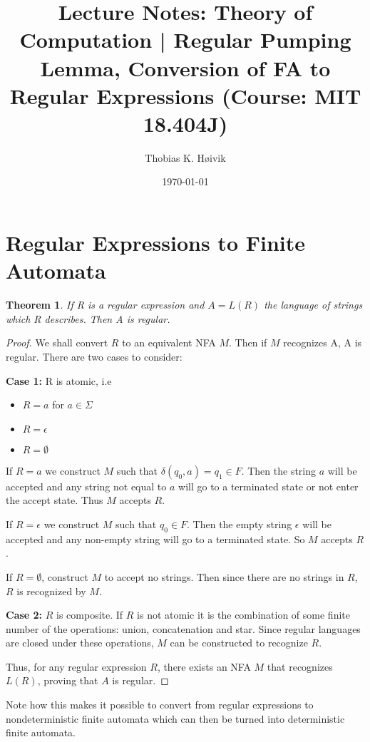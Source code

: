 \documentclass[12pt]{article}
\title{Lecture Notes: Theory of Computation | Regular Pumping Lemma, Conversion of FA to Regular Expressions (Course: MIT 18.404J)}
\author{Thobias K. Høivik}
\date{\today}
\newtheorem{theorem}{Theorem}
\begin{document}
\maketitle
\section*{Regular Expressions to Finite Automata} 
\begin{theorem}
    If R is a regular expression and \(A = L(R)\) the language of strings which R 
    describes. Then A is regular. 
\end{theorem}
\begin{proof}
    We shall convert \(R\) to an equivalent NFA \(M\). Then if 
    \(M\) recognizes A, A is regular.
    There are two cases to consider: 

    \noindent 
    \textbf{Case 1:} R is atomic, i.e 
    \begin{itemize}
        \item \(R = a\) for \(a\in \Sigma\)
        \item \(R = \epsilon\)
        \item \(R = \emptyset\)
    \end{itemize}
    If \(R = a\) we construct \(M\) such that \(\delta(q_0, a) = q_1 \in F\).  
    Then the string \(a\) will be accepted and any string not equal to \(a\) 
    will go to a terminated state or not enter the accept state. 
    Thus \(M\) accepts \(R\). 
    
    \noindent 
    If \(R = \epsilon\) we construct \(M\) such that \(q_0 \in F\). 
    Then the empty string \(\epsilon\) will be accepted and any non-empty string will 
    go to a terminated state. So \(M\) accepts \(R\).

    \noindent 
    If \(R = \emptyset\), construct \(M\) to accept no strings. Then since there are 
    no strings in \(R\), \(R\) is recognized by \(M\).

    \noindent 
    \textbf{Case 2:} \(R\) is composite. If \(R\) is not atomic it is the 
    combination of some finite number of the operations: union, concatenation and star. 
    Since regular languages are closed under these operations, \(M\) can be constructed 
    to recognize \(R\).

    \noindent 
    Thus, for any regular expression \( R \),   
    there exists an NFA \( M \) that recognizes \( L(R) \), 
    proving that \( A \) is regular.
\end{proof}
\noindent
Note how this makes it possible to convert from regular expressions to 
nondeterministic finite automata which can then be turned into deterministic 
finite automata.
\end{document}
